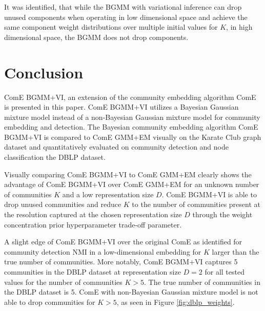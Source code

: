 \documentclass[conference]{IEEEtran}
\begin{document}
It was identified, that while the BGMM with variational inference can drop unused components when operating in low dimensional space and achieve the same component weight distributions over multiple initial values for $K$, in high dimensional space, the BGMM does not drop components.

\section{Conclusion}

ComE BGMM+VI, an extension of the community embedding algorithm ComE is presented in this paper. ComE BGMM+VI utilizes a Bayesian Gaussian mixture model instead of a non-Bayesian Gaussian mixture model for community embedding and detection. The Bayesian community embedding algorithm ComE BGMM+VI is compared to ComE GMM+EM visually on the Karate Club graph dataset and quantitatively evaluated on community detection and node classification the DBLP dataset.

Visually comparing ComE BGMM+VI to ComE GMM+EM clearly shows the advantage of ComE BGMM+VI over ComE GMM+EM for an unknown number of communities $K$ and a low representation size $D$. ComE BGMM+VI is able to drop unused communities and reduce $K$ to the number of communities present at the resolution captured at the chosen representation size $D$ through the weight concentration prior hyperparameter trade-off parameter.

A slight edge of ComE BGMM+VI over the original ComE as identified for community detection NMI in a low-dimensional embedding for $K$ larger than the true number of communities. More notably, ComE BGMM+VI captures 5 communities in the DBLP dataset at representation size $D=2$ for all tested values for the number of communities $K>5$. The true number of communities in the DBLP dataset is 5. ComE with non-Bayesian Gaussian mixture model is not able to drop communities for $K>5$, as seen in Figure \ref{fig:dblp_weights}.





















\end{document}
